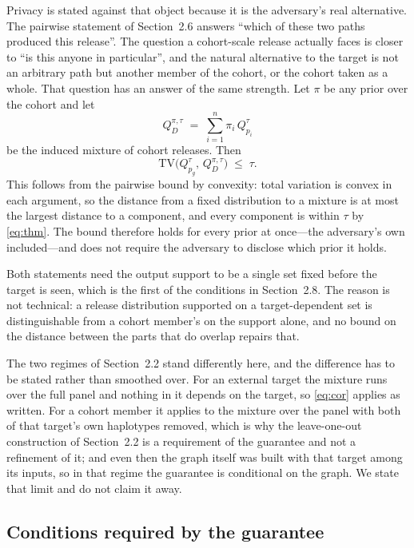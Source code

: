 Privacy is stated against that object because it is the adversary's real
alternative. The pairwise statement of Section~2.6 answers ``which of these two
paths produced this release''. The question a cohort-scale release actually faces is
closer to ``is this anyone in particular'', and the natural alternative to the target
is not an arbitrary path but another member of the cohort, or the cohort taken as a
whole. That question has an answer of the same strength. Let $\pi$ be any prior over
the cohort and let
\begin{equation}
Q^{\pi,\tau}_{D} \;=\; \sum_{i=1}^{n} \pi_i\, Q^{\tau}_{p_i}
\end{equation}
be the induced mixture of cohort releases. Then
\begin{equation}
\mathrm{TV}\!\big(Q^{\tau}_{p_g},\, Q^{\pi,\tau}_{D}\big) \;\le\; \tau .
\label{eq:cor}
\end{equation}
This follows from the pairwise bound by convexity: total variation is convex in each
argument, so the distance from a fixed distribution to a mixture is at most the
largest distance to a component, and every component is within $\tau$ by
\eqref{eq:thm}. The bound therefore holds for every prior at once---the adversary's
own included---and does not require the adversary to disclose which prior it holds.

Both statements need the output support to be a single set fixed before the target is
seen, which is the first of the conditions in Section~2.8. The reason is not
technical: a release distribution supported on a target-dependent set is
distinguishable from a cohort member's on the support alone, and no bound on the
distance between the parts that do overlap repairs that.

The two regimes of Section~2.2 stand differently here, and the difference has to be
stated rather than smoothed over. For an external target the mixture runs over the
full panel and nothing in it depends on the target, so \eqref{eq:cor} applies as
written. For a cohort member it applies to the mixture over the panel with both of
that target's own haplotypes removed, which is why the leave-one-out construction of
Section~2.2 is a requirement of the guarantee and not a refinement of it; and even
then the graph itself was built with that target among its inputs, so in that regime
the guarantee is conditional on the graph. We state that limit and do not claim it
away.

\subsection{Conditions required by the guarantee}

